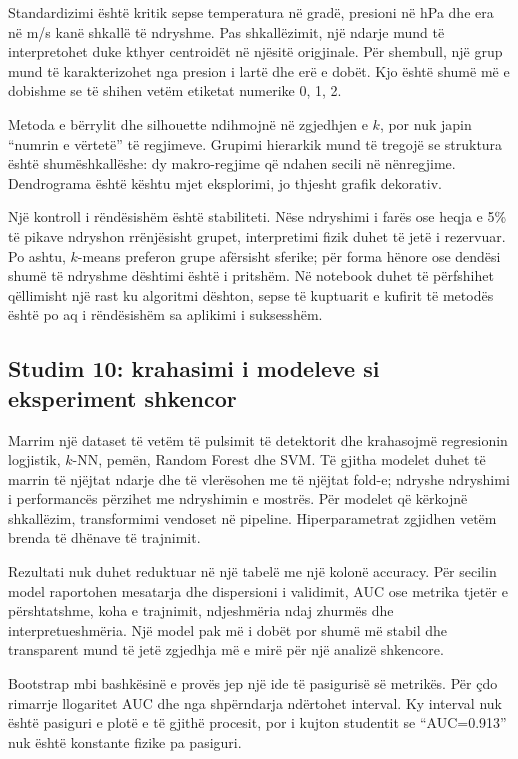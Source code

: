 \documentclass[12pt,a4paper,oneside]{book}
\begin{document}
Standardizimi është kritik sepse temperatura në gradë, presioni në hPa dhe era në m/s kanë shkallë të ndryshme. Pas shkallëzimit, një ndarje mund të interpretohet duke kthyer centroidët në njësitë origjinale. Për shembull, një grup mund të karakterizohet nga presion i lartë dhe erë e dobët. Kjo është shumë më e dobishme se të shihen vetëm etiketat numerike 0, 1, 2.

Metoda e bërrylit dhe silhouette ndihmojnë në zgjedhjen e $k$, por nuk japin “numrin e vërtetë” të regjimeve. Grupimi hierarkik mund të tregojë se struktura është shumëshkallëshe: dy makro-regjime që ndahen secili në nënregjime. Dendrograma është kështu mjet eksplorimi, jo thjesht grafik dekorativ.

Një kontroll i rëndësishëm është stabiliteti. Nëse ndryshimi i farës ose heqja e 5\% të pikave ndryshon rrënjësisht grupet, interpretimi fizik duhet të jetë i rezervuar. Po ashtu, $k$-means preferon grupe afërsisht sferike; për forma hënore ose dendësi shumë të ndryshme dështimi është i pritshëm. Në notebook duhet të përfshihet qëllimisht një rast ku algoritmi dështon, sepse të kuptuarit e kufirit të metodës është po aq i rëndësishëm sa aplikimi i suksesshëm.

\subsection*{Studim 10: krahasimi i modeleve si eksperiment shkencor}
Marrim një dataset të vetëm të pulsimit të detektorit dhe krahasojmë regresionin logjistik, $k$-NN, pemën, Random Forest dhe SVM. Të gjitha modelet duhet të marrin të njëjtat ndarje dhe të vlerësohen me të njëjtat fold-e; ndryshe ndryshimi i performancës përzihet me ndryshimin e mostrës. Për modelet që kërkojnë shkallëzim, transformimi vendoset në pipeline. Hiperparametrat zgjidhen vetëm brenda të dhënave të trajnimit.

Rezultati nuk duhet reduktuar në një tabelë me një kolonë accuracy. Për secilin model raportohen mesatarja dhe dispersioni i validimit, AUC ose metrika tjetër e përshtatshme, koha e trajnimit, ndjeshmëria ndaj zhurmës dhe interpretueshmëria. Një model pak më i dobët por shumë më stabil dhe transparent mund të jetë zgjedhja më e mirë për një analizë shkencore.

Bootstrap mbi bashkësinë e provës jep një ide të pasigurisë së metrikës. Për çdo rimarrje llogaritet AUC dhe nga shpërndarja ndërtohet interval. Ky interval nuk është pasiguri e plotë e të gjithë procesit, por i kujton studentit se “AUC=0.913” nuk është konstante fizike pa pasiguri.
\end{document}
